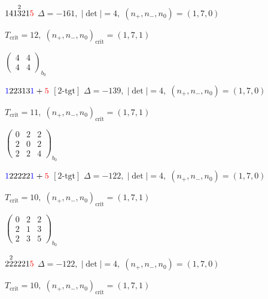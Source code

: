 \documentclass[10pt]{article}
\begin{document}
\smallskip

$141\overset{2}{3}21\textcolor{red}{5}$ \quad $\Delta=-161,\; |\det|=4,\; (n_+,n_-,n_0)=(1,7,0)$

\hspace{1em}$T_{\text{crit}}=12,\; (n_+,n_-,n_0)_{\text{crit}}=(1,7,1)$

\hspace{2em}$\left(\begin{smallmatrix}4 & 4 \\ 4 & 4\end{smallmatrix}\right)_{\!b_0}$

\smallskip

$\textcolor{blue}{1}22313\textcolor{blue}{1}+\textcolor{red}{5}$ $\scriptstyle [2\text{-tgt}]$ \quad $\Delta=-139,\; |\det|=4,\; (n_+,n_-,n_0)=(1,7,0)$

\hspace{1em}$T_{\text{crit}}=11,\; (n_+,n_-,n_0)_{\text{crit}}=(1,7,1)$

\hspace{2em}$\left(\begin{smallmatrix}0 & 2 & 2 \\ 2 & 0 & 2 \\ 2 & 2 & 4\end{smallmatrix}\right)_{\!b_0}$

\smallskip

$\textcolor{blue}{1}22222\textcolor{blue}{1}+\textcolor{red}{5}$ $\scriptstyle [2\text{-tgt}]$ \quad $\Delta=-122,\; |\det|=4,\; (n_+,n_-,n_0)=(1,7,0)$

\hspace{1em}$T_{\text{crit}}=10,\; (n_+,n_-,n_0)_{\text{crit}}=(1,7,1)$

\hspace{2em}$\left(\begin{smallmatrix}0 & 2 & 2 \\ 2 & 1 & 3 \\ 2 & 3 & 5\end{smallmatrix}\right)_{\!b_0}$

\smallskip

$2\overset{2}{2}2221\textcolor{red}{5}$ \quad $\Delta=-122,\; |\det|=4,\; (n_+,n_-,n_0)=(1,7,0)$

\hspace{1em}$T_{\text{crit}}=10,\; (n_+,n_-,n_0)_{\text{crit}}=(1,7,1)$
\end{document}
